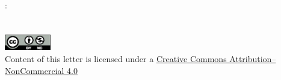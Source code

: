 
\thispagestyle{empty}

\hfill

\vfill

\noindent\myName:\\[2pt]
\textit{\myTitle}\\[-3.5pt]{\small\mySubtitle}\\[4pt]%
\includegraphics[width=2cm]{gfx/cc_by_nc__Logo}\\[-2.5pt]
{\footnotesize Content of this letter  is licensed under a \href{http://creativecommons.org/licenses/by-nc/4.0/}{Creative Commons Attribution--NonCommercial 4.0}} %

